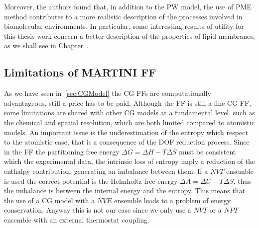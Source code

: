 Moreover, the authors found that, in addition to the \ac{PW} model, the use of \ac{PME} method contributes to a 
more realistic description of the processes involved in biomolecular environments. In particular, some 
interesting results of utility for this thesis work concern a better description of the properties of lipid 
membranes, as we shall see in Chapter~. 
			
\subsection{Limitations of MARTINI FF}
As we have seen in~\ref{sec:CGModel} the \ac{CG} \acp{FF} are computationally advantageous, still a price has to 
be paid. Although the \martini \ac{FF} is still a fine \ac{CG} \ac{FF}, some limitations are shared with other 
\ac{CG} models at a fundamental level, such as the chemical and spatial resolution, which are both limited 
compared to atomistic models. An important issue is the underestimation of the entropy which respect to the 
atomistic case, that is a consequence of the \ac{DOF} reduction process. Since in the \martini \ac{FF} the 
partitioning free energy $\Delta G = \Delta H - T\Delta S$ must be consistent which the experimental data, the 
intrinsic loss of entropy imply a reduction of the enthalpy contribution, generating an imbalance between them. 
If a $NVT$ ensemble is used the correct potential is the Helmholtz free energy $\Delta A = \Delta U - T\Delta S$, 
thus the imbalance is between the internal energy and the entropy. This means that the use of a \ac{CG} model 
with a $NVE$ ensemble leads to a problem of energy conservation. Anyway this is not our case since we only use a 
$NVT$ or a $NPT$ ensemble with an external thermostat coupling.


